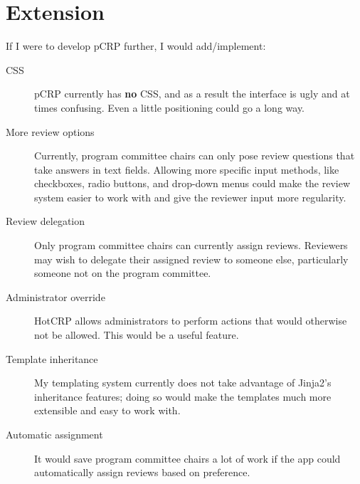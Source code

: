 \documentclass[12pt]{article}
\begin{document}
\section{Extension}
	If I were to develop pCRP further, I would add/implement:
	\begin{description}
		\item[CSS] pCRP currently has \textbf{no} CSS, and as a result the
			interface is ugly and at times confusing. Even a little
			positioning could go a long way.
		\item[More review options] Currently, program committee chairs
			can only pose review questions that take answers in text fields.
			Allowing more specific input methods, like checkboxes,
			radio buttons, and drop-down menus could make the review system
			easier to work with and give the reviewer input more regularity.
		\item[Review delegation] Only program committee chairs can currently
			assign reviews. Reviewers may wish to delegate their assigned
			review to someone else, particularly someone not on the program
			committee.
		\item[Administrator override] HotCRP allows administrators to perform
			actions that would otherwise not be allowed. This would be a
			useful feature.
		\item[Template inheritance] My templating system currently does not
			take advantage of Jinja2's inheritance features; doing so would
			make the templates much more extensible and easy to work with.
		\item[Automatic assignment] It would save program committee chairs
			a lot of work if the app could automatically assign reviews based
			on preference.
	\end{description}
	


\end{document}
